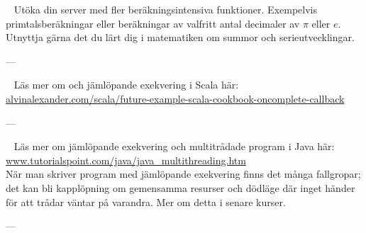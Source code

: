 \WHAT{}

\QUESTBEGIN

\Task  \what~ Utöka din server med fler beräkningsintensiva funktioner. Exempelvis primtalsberäkningar eller beräkningar av valfritt antal decimaler av $\pi$ eller $e$. Utnyttja gärna det du lärt dig i  matematiken om summor och serieutvecklingar.

\SOLUTION


\TaskSolved \what

---


\QUESTEND






\WHAT{}

\QUESTBEGIN

\Task  \what~ Läs mer om  och jämlöpande exekvering i Scala här:\\
\href{http://alvinalexander.com/scala/future-example-scala-cookbook-oncomplete-callback}{alvinalexander.com/scala/future-example-scala-cookbook-oncomplete-callback}

\SOLUTION


\TaskSolved \what

---


\QUESTEND






\WHAT{}

\QUESTBEGIN

\Task  \what~ Läs mer om jämlöpande exekvering och multitrådade program i Java här: \href{http://www.tutorialspoint.com/java/java_multithreading.htm}{www.tutorialspoint.com/java/java\_multithreading.htm}  \\
\noindent När man skriver program med jämlöpande exekvering finns det många fallgropar; det kan bli kapplöpning  om gemensamma resurser och dödläge  där inget händer för att trådar väntar på varandra. Mer om detta i senare kurser.


\SOLUTION


\TaskSolved \what

---


\QUESTEND







\QUESTBEGIN

\Task  \what~\Pen

